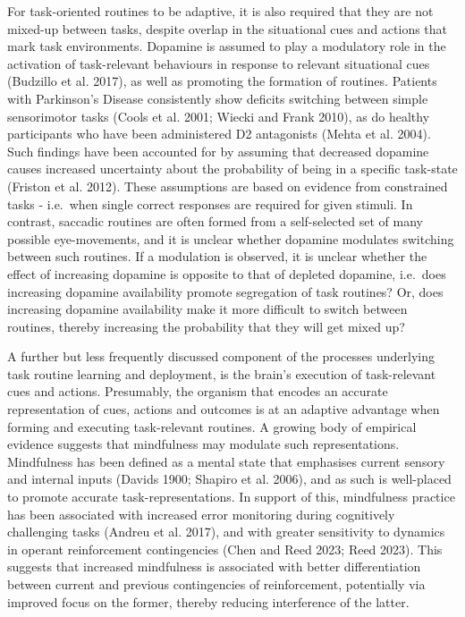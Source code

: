 \documentclass{article}
\begin{document}
For task-oriented routines to be adaptive, it is also required that they
are not mixed-up between tasks, despite overlap in the situational cues
and actions that mark task environments. Dopamine is assumed to play a
modulatory role in the activation of task-relevant behaviours in
response to relevant situational cues (Budzillo et al. 2017), as well as
promoting the formation of routines. Patients with Parkinson's Disease
consistently show deficits switching between simple sensorimotor tasks
(Cools et al. 2001; Wiecki and Frank 2010), as do healthy participants
who have been administered D2 antagonists (Mehta et al. 2004). Such
findings have been accounted for by assuming that decreased dopamine
causes increased uncertainty about the probability of being in a
specific task-state (Friston et al. 2012). These assumptions are based
on evidence from constrained tasks - i.e.~when single correct responses
are required for given stimuli. In contrast, saccadic routines are often
formed from a self-selected set of many possible eye-movements, and it
is unclear whether dopamine modulates switching between such routines.
If a modulation is observed, it is unclear whether the effect of
increasing dopamine is opposite to that of depleted dopamine, i.e.~does
increasing dopamine availability promote segregation of task routines?
Or, does increasing dopamine availability make it more difficult to
switch between routines, thereby increasing the probability that they
will get mixed up?

A further but less frequently discussed component of the processes
underlying task routine learning and deployment, is the brain's
execution of task-relevant cues and actions. Presumably, the organism
that encodes an accurate representation of cues, actions and outcomes is
at an adaptive advantage when forming and executing task-relevant
routines. A growing body of empirical evidence suggests that mindfulness
may modulate such representations. Mindfulness has been defined as a
mental state that emphasises current sensory and internal inputs (Davids
1900; Shapiro et al. 2006), and as such is well-placed to promote
accurate task-representations. In support of this, mindfulness practice
has been associated with increased error monitoring during cognitively
challenging tasks (Andreu et al. 2017), and with greater sensitivity to
dynamics in operant reinforcement contingencies (Chen and Reed 2023;
Reed 2023). This suggests that increased mindfulness is associated with
better differentiation between current and previous contingencies of
reinforcement, potentially via improved focus on the former, thereby
reducing interference of the latter.
\end{document}
